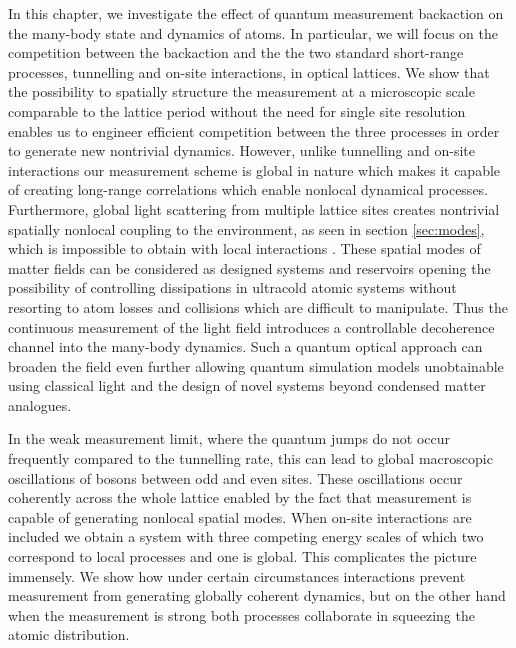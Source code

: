 In this chapter, we investigate the effect of quantum measurement
backaction on the many-body state and dynamics of atoms. In
particular, we will focus on the competition between the backaction
and the the two standard short-range processes, tunnelling and on-site
interactions, in optical lattices. We show that the possibility to
spatially structure the measurement at a microscopic scale comparable
to the lattice period without the need for single site resolution
enables us to engineer efficient competition between the three
processes in order to generate new nontrivial dynamics. However,
unlike tunnelling and on-site interactions our measurement scheme is
global in nature which makes it capable of creating long-range
correlations which enable nonlocal dynamical processes. Furthermore,
global light scattering from multiple lattice sites creates nontrivial
spatially nonlocal coupling to the environment, as seen in section
\ref{sec:modes}, which is impossible to obtain with local interactions
\cite{daley2014, diehl2008, syassen2008}. These spatial modes of
matter fields can be considered as designed systems and reservoirs
opening the possibility of controlling dissipations in ultracold
atomic systems without resorting to atom losses and collisions which
are difficult to manipulate. Thus the continuous measurement of the
light field introduces a controllable decoherence channel into the
many-body dynamics. Such a quantum optical approach can broaden the
field even further allowing quantum simulation models unobtainable
using classical light and the design of novel systems beyond condensed
matter analogues.

In the weak measurement limit, where the quantum jumps do not occur
frequently compared to the tunnelling rate, this can lead to global
macroscopic oscillations of bosons between odd and even sites. These
oscillations occur coherently across the whole lattice enabled by the
fact that measurement is capable of generating nonlocal spatial
modes. When on-site interactions are included we obtain a system with
three competing energy scales of which two correspond to local
processes and one is global. This complicates the picture
immensely. We show how under certain circumstances interactions
prevent measurement from generating globally coherent dynamics, but on
the other hand when the measurement is strong both processes
collaborate in squeezing the atomic distribution.

